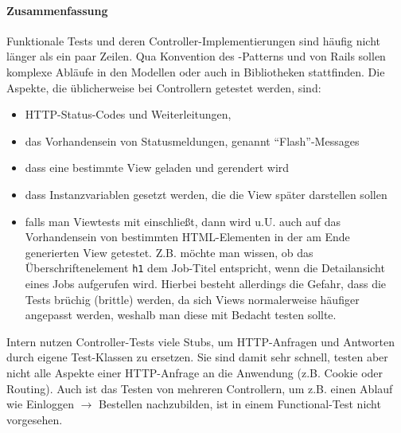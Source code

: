 \paragraph{Zusammenfassung}
Funktionale Tests und deren Controller-Implementierungen sind häufig nicht länger als ein paar Zeilen. Qua Konvention des -Patterns und von Rails sollen komplexe Abläufe in den Modellen oder auch in Bibliotheken stattfinden.
Die Aspekte, die üblicherweise bei Controllern getestet werden, sind:
\begin{itemize}
 \item HTTP-Status-Codes und Weiterleitungen,
 \item das Vorhandensein von Statusmeldungen, genannt "`Flash"'-Messages
 \item dass eine bestimmte View geladen und gerendert wird
 \item dass Instanzvariablen gesetzt werden, die die View später darstellen sollen
 \item falls man Viewtests mit einschließt, dann wird u.U. auch auf das Vorhandensein von bestimmten HTML-Elementen in der am Ende generierten View getestet. Z.B. möchte man wissen, ob das Überschriftenelement \texttt{h1} dem Job-Titel entspricht, wenn die Detailansicht eines Jobs aufgerufen wird. Hierbei besteht allerdings die Gefahr, dass die Tests brüchig (brittle) werden, da sich Views normalerweise häufiger angepasst werden, weshalb man diese mit Bedacht testen sollte.
\end{itemize}

Intern nutzen Controller-Tests viele Stubs, um HTTP-Anfragen und Antworten durch eigene Test-Klassen zu ersetzen. Sie sind damit sehr schnell, testen aber nicht alle Aspekte einer HTTP-Anfrage an die Anwendung (z.B. Cookie oder Routing). Auch ist das Testen von mehreren Controllern, um z.B. einen Ablauf wie Einloggen $\to$ Bestellen nachzubilden, ist in einem Functional-Test nicht vorgesehen.
